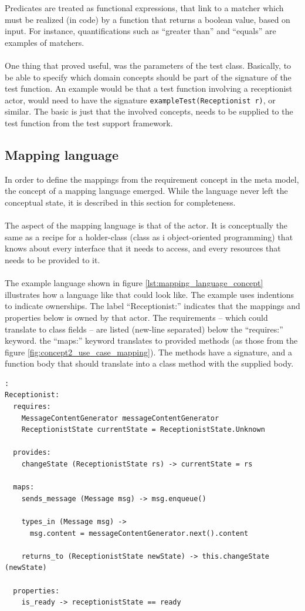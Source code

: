 Predicates are treated as functional expressions, that link to a matcher which must be realized (in code) by a function that returns a boolean value, based on input. For instance, quantifications such as ``greater than'' and ``equals'' are examples of matchers.\\\\
One thing that proved useful, was the parameters of the test class. Basically, to be able to specify which domain concepts should be part of the signature of the test function. An example would be that a test function involving a receptionist actor, would need to have the signature \texttt{exampleTest(Receptionist r)}, or similar. The basic is just that the involved concepts, needs to be supplied to the test function from the test support framework.
\subsection{Mapping language}
In order to define the mappings from the requirement concept in the meta model, the concept of a mapping language emerged. While the language never left the conceptual state, it is described in this section for completeness.\\\\
The aspect of the mapping language is that of the actor. It is conceptually the same as a recipe for a holder-class (class as i object-oriented programming) that knows about every interface that it needs to access, and every resources that needs to be provided to it.\\\\
The example language shown in figure \ref{lst:mapping_language_concept} illustrates how a language like that could look like. The example uses indentions to indicate ownerships. The label ``Receptionist:'' indicates that the mappings and properties below is owned by that actor. The requirements -- which could translate to class fields -- are listed (new-line separated) below the ``requires:'' keyword. the ``maps:'' keyword translates to provided methods (as those from the figure \ref{fig:concept2_use_case_mapping}). The methods have a signature, and a function body that should translate into a class method with the supplied body.\\
\begin{lstlisting}[caption=example language for mapping concepts,label={lst:mapping_language_concept}]:
Receptionist:
  requires:
    MessageContentGenerator messageContentGenerator
    ReceptionistState currentState = ReceptionistState.Unknown
  
  provides:
    changeState (ReceptionistState rs) -> currentState = rs
  
  maps:
    sends_message (Message msg) -> msg.enqueue()

    types_in (Message msg) -> 
      msg.content = messageContentGenerator.next().content
    
    returns_to (ReceptionistState newState) -> this.changeState (newState)

  properties:
    is_ready -> receptionistState == ready
\end{lstlisting}

